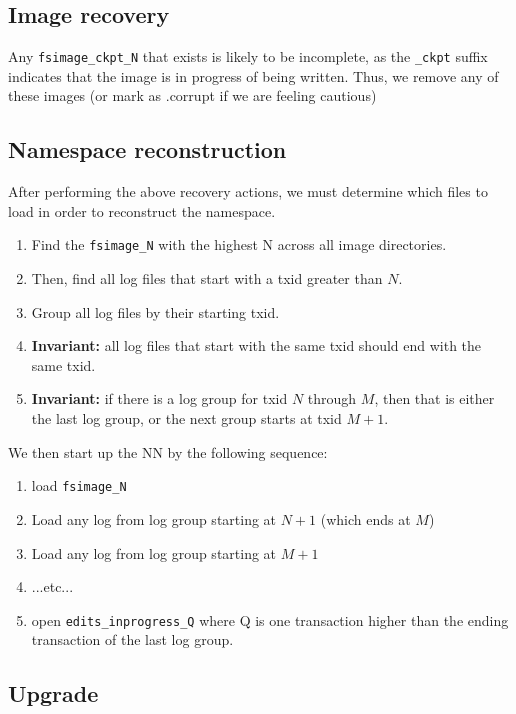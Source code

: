 \documentclass{article}
\begin{document}
\subsection{Image recovery}

Any {\tt fsimage\_ckpt\_N} that exists is likely to be incomplete, as the {\tt \_ckpt} suffix indicates that the image is in progress of being written. Thus, we remove any of these images (or mark as .corrupt if we are feeling cautious)

\subsection{Namespace reconstruction}
\label{ns-reconstruction}
After performing the above recovery actions, we must determine which files to load in order to reconstruct the namespace.

\begin{enumerate}
\item Find the {\tt fsimage\_N} with the highest N across all image directories.
\item Then, find all log files that start with a txid greater than $N$.
\item Group all log files by their starting txid.
\item {\bf Invariant:} all log files that start with the same txid should end with the same txid.
\item {\bf Invariant:} if there is a log group for txid $N$ through $M$, then that is either the last log group, or the next group starts at txid $M+1$.
\end{enumerate}

We then start up the NN by the following sequence:
\begin{enumerate}
\item load {\tt fsimage\_N}
\item Load any log from log group starting at $N+1$ (which ends at $M$)
\item Load any log from log group starting at $M+1$
\item ...etc...
\item open {\tt edits\_inprogress\_Q} where Q is one transaction higher than the ending transaction of the last log group.
\end{enumerate}

\subsection{Upgrade}
\end{document}

